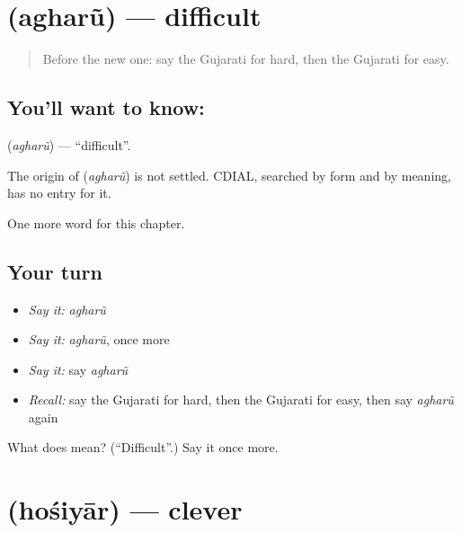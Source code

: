 \section[\texorpdfstring{\gu{અઘરું} (agharũ)}{અઘરું (agharũ)}]{ (agharũ) — difficult}

\label{lesson:GU-C133-agharu}



\begin{quote}
Before the new one: say the Gujarati for hard, then the Gujarati for easy.
\end{quote}

\subsection*{You'll want to know: }
\textbf{} (\emph{agharũ}) — \textquotedblleft{}difficult\textquotedblright{}.

\begin{cousinweb}
The origin of \textbf{} (\emph{agharũ}) is not settled. CDIAL, searched by form and by meaning, has no entry for it.
\end{cousinweb}

\begin{grammarlens}[title={What you've built}]
One more word for this chapter.
\end{grammarlens}

\subsection*{Your turn}
\begin{itemize}
\raggedright
  \item \emph{Say it:} \emph{agharũ}
  \item \emph{Say it:} \emph{agharũ}, once more
  \item \emph{Say it:} say \emph{agharũ}
  \item \emph{Recall:} say the Gujarati for hard, then the Gujarati for easy, then say \emph{agharũ} again
\end{itemize}

\begin{tcolorbox}[breakable,colback=teal!4,colframe=teal!35!black,title={Before you move on}]
What does  mean? (\textquotedblleft{}Difficult\textquotedblright{}.) Say it once more.
\end{tcolorbox}
\section[\texorpdfstring{\gu{હોશિયાર} (hośiyār)}{હોશિયાર (hośiyār)}]{ (hośiyār) — clever}

